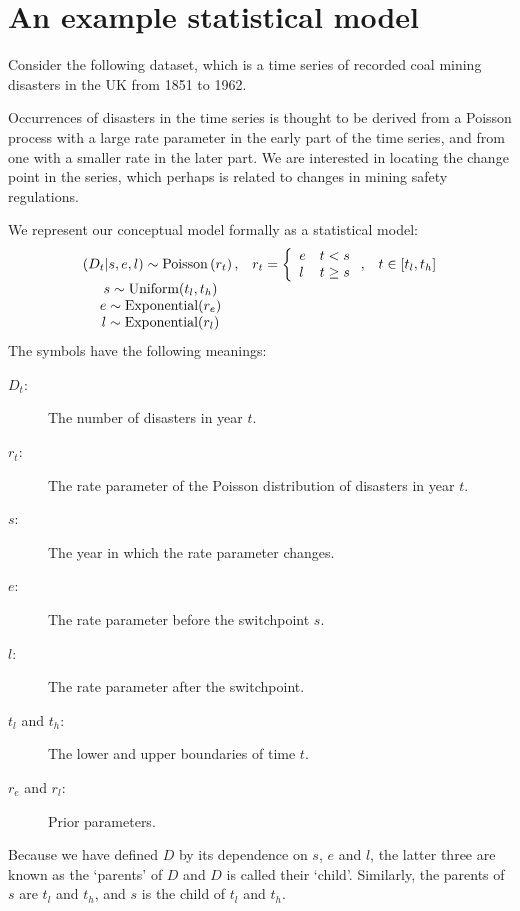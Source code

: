 

\section*{An example statistical model}
Consider the following dataset, which is a time series of recorded coal mining disasters in the UK from 1851 to 1962.
\begin{center}
\end{center}
Occurrences of disasters in the time series is thought to be derived from a Poisson process with a large rate parameter in the early part of the time series, and from one with a smaller rate in the later part. We are interested in locating the change point in the series, which perhaps is related to changes in mining safety regulations.

We represent our conceptual model formally as a statistical model:
\begin{equation}
    \begin{array}{ccc}
        (D_t | s, e, l) \sim \textup{Poisson}\left(r_t\right), & r_t=\left\{\begin{array}{ll}
            e & t< s\\ l & t\ge s
            \end{array}\right.,&t\in[t_l,t_h]\\
        s\sim \textup{Uniform}(t_l, t_h)\\
        e\sim \textup{Exponential}(r_e)\\
        l\sim \textup{Exponential}(r_l)        
    \end{array}
    \label{disastermodel} 
\end{equation}
The symbols have the following meanings:
\begin{description}
    \item[$D_t$:] The number of disasters in year $t$.
    \item[$r_t$:] The rate parameter of the Poisson distribution of disasters in year $t$.
    \item[$s$:] The year in which the rate parameter changes.
    \item[$e$:] The rate parameter before the switchpoint $s$.
    \item[$l$:] The rate parameter after the switchpoint.
    \item[$t_l$ and $t_h$:] The lower and upper boundaries of time $t$.
    \item[$r_e$ and $r_l$:] Prior parameters.
\end{description}
Because we have defined $D$ by its dependence on $s$, $e$ and $l$, the latter three are known as the `parents' of $D$ and $D$ is called their `child'. Similarly, the parents of $s$ are $t_l$ and $t_h$, and $s$ is the child of $t_l$ and $t_h$.


